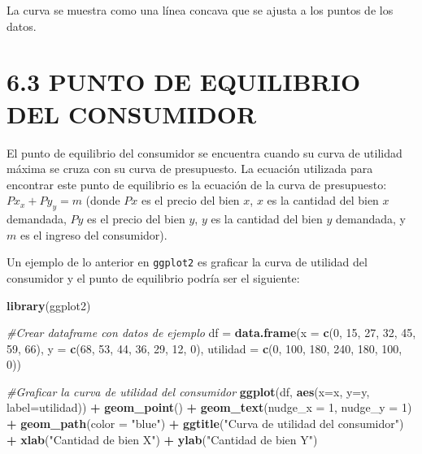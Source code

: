 \documentclass[
  spanish,
  12pt,
]{book}
\newenvironment{Shaded}{\begin{snugshade}}{\end{snugshade}}
\newcommand{\AttributeTok}[1]{\textcolor[rgb]{0.13,0.29,0.53}{#1}}
\newcommand{\CommentTok}[1]{\textcolor[rgb]{0.56,0.35,0.01}{\textit{#1}}}
\newcommand{\DecValTok}[1]{\textcolor[rgb]{0.00,0.00,0.81}{#1}}
\newcommand{\FunctionTok}[1]{\textcolor[rgb]{0.13,0.29,0.53}{\textbf{#1}}}
\newcommand{\NormalTok}[1]{#1}
\newcommand{\OtherTok}[1]{\textcolor[rgb]{0.56,0.35,0.01}{#1}}
\newcommand{\SpecialCharTok}[1]{\textcolor[rgb]{0.81,0.36,0.00}{\textbf{#1}}}
\newcommand{\StringTok}[1]{\textcolor[rgb]{0.31,0.60,0.02}{#1}}
\begin{document}
La curva se muestra como una línea concava que se ajusta a los puntos de
los datos.

\newpage

\section{6.3 PUNTO DE EQUILIBRIO DEL
CONSUMIDOR}\label{punto-de-equilibrio-del-consumidor}

El punto de equilibrio del consumidor se encuentra cuando su curva de
utilidad máxima se cruza con su curva de presupuesto. La ecuación
utilizada para encontrar este punto de equilibrio es la ecuación de la
curva de presupuesto: \(Px_{x} + Py_{y} = m\) (donde \(Px\) es el precio
del bien \(x\), \(x\) es la cantidad del bien \(x\) demandada, \(Py\) es
el precio del bien \(y\), \(y\) es la cantidad del bien \(y\) demandada,
y \(m\) es el ingreso del consumidor).

Un ejemplo de lo anterior en \texttt{ggplot2} es graficar la curva de
utilidad del consumidor y el punto de equilibrio podría ser el
siguiente:

\begin{Shaded}
\begin{Highlighting}[]
\FunctionTok{library}\NormalTok{(ggplot2)}

\CommentTok{\#Crear dataframe con datos de ejemplo}
\NormalTok{df }\OtherTok{=} \FunctionTok{data.frame}\NormalTok{(}\AttributeTok{x =} \FunctionTok{c}\NormalTok{(}\DecValTok{0}\NormalTok{, }\DecValTok{15}\NormalTok{, }\DecValTok{27}\NormalTok{, }\DecValTok{32}\NormalTok{, }\DecValTok{45}\NormalTok{, }\DecValTok{59}\NormalTok{, }\DecValTok{66}\NormalTok{), }
                 \AttributeTok{y =} \FunctionTok{c}\NormalTok{(}\DecValTok{68}\NormalTok{, }\DecValTok{53}\NormalTok{, }\DecValTok{44}\NormalTok{, }\DecValTok{36}\NormalTok{, }\DecValTok{29}\NormalTok{, }\DecValTok{12}\NormalTok{, }\DecValTok{0}\NormalTok{), }
                 \AttributeTok{utilidad =} \FunctionTok{c}\NormalTok{(}\DecValTok{0}\NormalTok{, }\DecValTok{100}\NormalTok{, }\DecValTok{180}\NormalTok{, }\DecValTok{240}\NormalTok{, }\DecValTok{180}\NormalTok{, }\DecValTok{100}\NormalTok{, }\DecValTok{0}\NormalTok{))}

\CommentTok{\#Graficar la curva de utilidad del consumidor}
\FunctionTok{ggplot}\NormalTok{(df, }\FunctionTok{aes}\NormalTok{(}\AttributeTok{x=}\NormalTok{x, }\AttributeTok{y=}\NormalTok{y, }\AttributeTok{label=}\NormalTok{utilidad)) }\SpecialCharTok{+}
  \FunctionTok{geom\_point}\NormalTok{() }\SpecialCharTok{+}
  \FunctionTok{geom\_text}\NormalTok{(}\AttributeTok{nudge\_x =} \DecValTok{1}\NormalTok{, }\AttributeTok{nudge\_y =} \DecValTok{1}\NormalTok{) }\SpecialCharTok{+}
  \FunctionTok{geom\_path}\NormalTok{(}\AttributeTok{color =} \StringTok{"blue"}\NormalTok{) }\SpecialCharTok{+}
  \FunctionTok{ggtitle}\NormalTok{(}\StringTok{"Curva de utilidad del consumidor"}\NormalTok{) }\SpecialCharTok{+}
  \FunctionTok{xlab}\NormalTok{(}\StringTok{"Cantidad de bien X"}\NormalTok{) }\SpecialCharTok{+}
  \FunctionTok{ylab}\NormalTok{(}\StringTok{"Cantidad de bien Y"}\NormalTok{)}
\end{Highlighting}
\end{Shaded}
\end{document}
